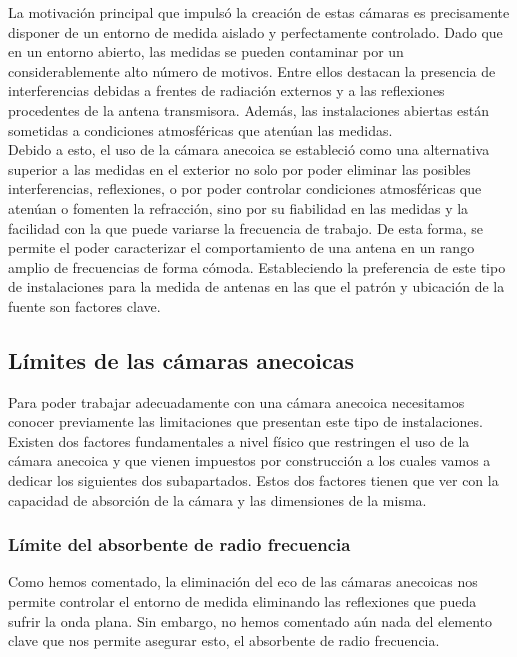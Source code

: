 \documentclass{article}
\begin{document}
La motivación principal que impulsó la creación de estas cámaras es precisamente disponer de un entorno de medida aislado y perfectamente controlado. Dado que en un entorno abierto, las medidas se pueden contaminar por un considerablemente alto número de motivos. Entre ellos destacan la presencia de interferencias debidas a frentes de radiación externos y a las reflexiones procedentes de la antena transmisora. Además, las instalaciones abiertas están sometidas a condiciones atmosféricas que atenúan las medidas.\\
Debido a esto, el uso de la cámara anecoica se estableció como una alternativa superior a las medidas en el exterior no solo por poder eliminar las posibles interferencias, reflexiones, o por poder controlar condiciones atmosféricas que atenúan o fomenten la refracción, sino por su fiabilidad en las medidas y la facilidad con la que puede variarse la frecuencia de trabajo. De esta forma, se permite el poder caracterizar el comportamiento de una antena en un rango amplio de frecuencias de forma cómoda. Estableciendo la preferencia de este tipo de instalaciones para la medida de antenas en las que el patrón y ubicación de la fuente son factores clave. 

\subsection{Límites de las cámaras anecoicas}

Para poder trabajar adecuadamente con una cámara anecoica necesitamos conocer previamente las limitaciones que presentan este tipo de instalaciones. Existen dos factores fundamentales a nivel físico que restringen el uso de la cámara anecoica y que vienen impuestos por construcción a los cuales vamos a dedicar los siguientes dos subapartados. Estos dos factores tienen que ver con la capacidad de absorción de la cámara y las dimensiones de la misma. 

\subsubsection{Límite del absorbente de radio frecuencia }

Como hemos comentado, la eliminación del eco de las cámaras anecoicas nos permite controlar el entorno de medida eliminando las reflexiones que pueda sufrir la onda plana. Sin embargo, no hemos comentado aún nada del elemento clave que nos permite asegurar esto, el absorbente de radio frecuencia. \\
\end{document}
